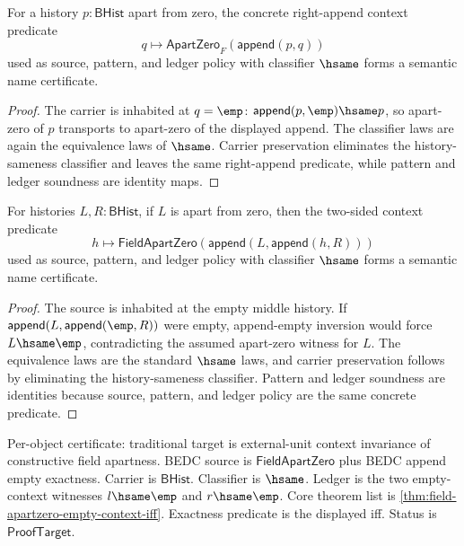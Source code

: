 \begin{theorem}
\label{thm:field-apartzero-append-right-context-semantic-namecert}
For a history $p:\mathsf{BHist}$ apart from zero, the concrete right-append
context predicate
$$
q\longmapsto \mathsf{ApartZero}_F(\mathsf{append}(p,q))
$$
used as source, pattern, and ledger policy with classifier $\hsame$ forms a
semantic name certificate.
\end{theorem}
\begin{proof}
The carrier is inhabited at $q=\emp$: $\mathsf{append}(p,\emp)\hsame p$, so
apart-zero of $p$ transports to apart-zero of the displayed append. The
classifier laws are again the equivalence laws of $\hsame$. Carrier
preservation eliminates the history-sameness classifier and leaves the same
right-append predicate, while pattern and ledger soundness are identity maps.
\end{proof}

\begin{theorem}
\label{thm:field-apartzero-two-sided-context-semantic-namecert}
For histories $L,R:\mathsf{BHist}$, if $L$ is apart from zero, then the
two-sided context predicate
$$
h\longmapsto \mathsf{FieldApartZero}(\mathsf{append}(L,\mathsf{append}(h,R)))
$$
used as source, pattern, and ledger policy with classifier $\hsame$ forms a
semantic name certificate.
\end{theorem}
\begin{proof}
The source is inhabited at the empty middle history. If
$\mathsf{append}(L,\mathsf{append}(\emp,R))$ were empty, append-empty
inversion would force $L\hsame\emp$, contradicting the assumed apart-zero
witness for $L$. The equivalence laws are the standard $\hsame$ laws, and
carrier preservation follows by eliminating the history-sameness classifier.
Pattern and ledger soundness are identities because source, pattern, and
ledger policy are the same concrete predicate.
\end{proof}

Per-object certificate: traditional target is external-unit context invariance
of constructive field apartness. BEDC source is $\mathsf{FieldApartZero}$ plus
BEDC append empty exactness. Carrier is $\mathsf{BHist}$. Classifier is
$\hsame$. Ledger is the two empty-context witnesses $l\hsame\emp$ and
$r\hsame\emp$. Core theorem list is
\autoref{thm:field-apartzero-empty-context-iff}. Exactness predicate is the
displayed iff. Status is $\mathsf{ProofTarget}$.

